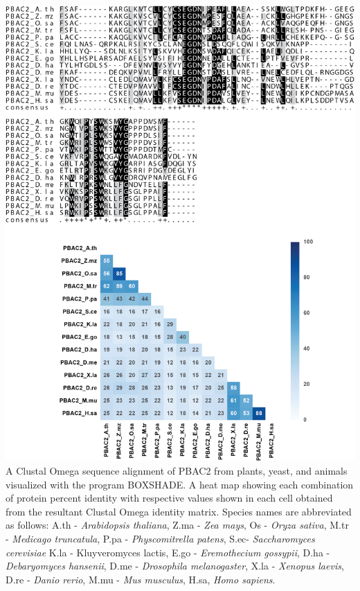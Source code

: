\begin{FPfigure}
	\ContinuedFloat
	\centering
	\includegraphics[width=\columnwidth]{Proteasome/pbac2align2.png}
	{A Clustal Omega \citep{sievers14} sequence alignment of PBAC2 from plants, yeast, and animals visualized with the program BOXSHADE. A heat map showing each combination of protein percent identity with respective values shown in each cell obtained from the resultant Clustal Omega identity matrix. Species names are abbreviated as follows: A.th - \textit{Arabidopsis thaliana}, Z.ma - \textit{Zea mays}, Os - \textit{Oryza sativa}, M.tr - \textit{Medicago truncatula}, P.pa - \textit{Physcomitrella patens}, S.ec- \textit{Saccharomyces cerevisiae} K.la - {Kluyveromyces lactis}, E.go - \textit{Eremothecium gossypii}, D.ha - \textit{Debaryomyces hansenii}, D.me - \textit{Drosophila melanogaster}, X.la - \textit{Xenopus laevis}, D.re - \textit{Danio rerio}, M.mu - \textit{Mus musculus}, H.sa, \textit{Homo sapiens}.}
	\label{fig:pbac2align2}
\end{FPfigure}
